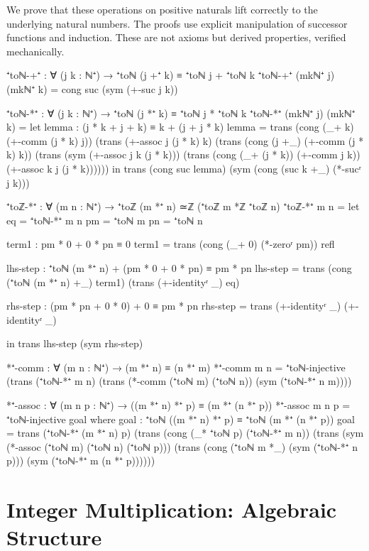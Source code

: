 \documentclass[11pt,a4paper]{book}
\begin{document}
We prove that these operations on positive naturals lift correctly to the underlying natural numbers.
The proofs use explicit manipulation of successor functions and induction.
These are not axioms but derived properties, verified mechanically.

\begin{code}
⁺toℕ-+⁺ : ∀ (j k : ℕ⁺) → ⁺toℕ (j +⁺ k) ≡ ⁺toℕ j + ⁺toℕ k
⁺toℕ-+⁺ (mkℕ⁺ j) (mkℕ⁺ k) = cong suc (sym (+-suc j k))

⁺toℕ-*⁺ : ∀ (j k : ℕ⁺) → ⁺toℕ (j *⁺ k) ≡ ⁺toℕ j * ⁺toℕ k
⁺toℕ-*⁺ (mkℕ⁺ j) (mkℕ⁺ k) = 
  let
    lemma : (j * k + j + k) ≡ k + (j + j * k)
    lemma = trans (cong (_+ k) (+-comm (j * k) j))
            (trans (+-assoc j (j * k) k)
            (trans (cong (j +_) (+-comm (j * k) k))
            (trans (sym (+-assoc j k (j * k)))
            (trans (cong (_+ (j * k)) (+-comm j k))
            (+-assoc k j (j * k))))))
  in trans (cong suc lemma) (sym (cong (suc k +_) (*-sucʳ j k)))

⁺toℤ-*⁺ : ∀ (m n : ℕ⁺) → ⁺toℤ (m *⁺ n) ≃ℤ (⁺toℤ m *ℤ ⁺toℤ n)
⁺toℤ-*⁺ m n = 
  let eq = ⁺toℕ-*⁺ m n
      pm = ⁺toℕ m
      pn = ⁺toℕ n
      
      term1 : pm * 0 + 0 * pn ≡ 0
      term1 = trans (cong (_+ 0) (*-zeroʳ pm)) refl
      
      lhs-step : ⁺toℕ (m *⁺ n) + (pm * 0 + 0 * pn) ≡ pm * pn
      lhs-step = trans (cong (⁺toℕ (m *⁺ n) +_) term1) 
                       (trans (+-identityʳ _) eq)
                       
      rhs-step : (pm * pn + 0 * 0) + 0 ≡ pm * pn
      rhs-step = trans (+-identityʳ _) (+-identityʳ _)
      
  in trans lhs-step (sym rhs-step)


*⁺-comm : ∀ (m n : ℕ⁺) → (m *⁺ n) ≡ (n *⁺ m)
*⁺-comm m n = ⁺toℕ-injective (trans (⁺toℕ-*⁺ m n) (trans (*-comm (⁺toℕ m) (⁺toℕ n)) (sym (⁺toℕ-*⁺ n m))))

*⁺-assoc : ∀ (m n p : ℕ⁺) → ((m *⁺ n) *⁺ p) ≡ (m *⁺ (n *⁺ p))
*⁺-assoc m n p = ⁺toℕ-injective goal
  where
    goal : ⁺toℕ ((m *⁺ n) *⁺ p) ≡ ⁺toℕ (m *⁺ (n *⁺ p))
    goal = trans (⁺toℕ-*⁺ (m *⁺ n) p)
           (trans (cong (_* ⁺toℕ p) (⁺toℕ-*⁺ m n))
           (trans (sym (*-assoc (⁺toℕ m) (⁺toℕ n) (⁺toℕ p)))
           (trans (cong (⁺toℕ m *_) (sym (⁺toℕ-*⁺ n p)))
                  (sym (⁺toℕ-*⁺ m (n *⁺ p))))))
\end{code}

\section{Integer Multiplication: Algebraic Structure}
\end{document}
